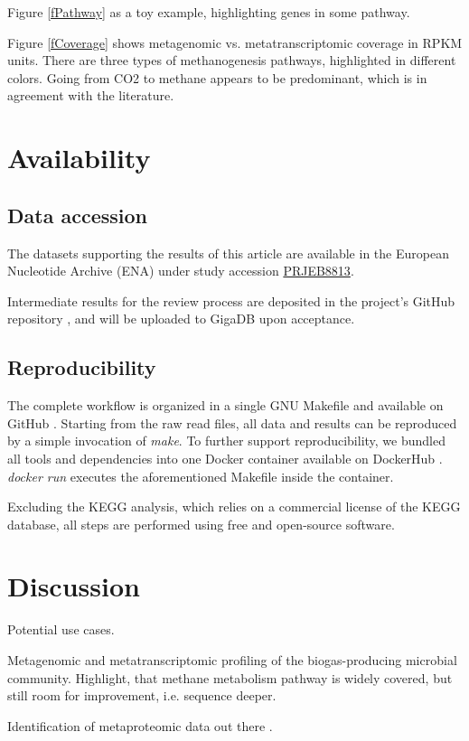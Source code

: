 \documentclass{bmcart}
\begin{document}
Figure \ref{fPathway} as a toy example, highlighting genes in some pathway.

Figure \ref{fCoverage} shows metagenomic vs. metatranscriptomic coverage in RPKM units. There are three types of methanogenesis pathways, highlighted in different colors. Going from CO2 to methane appears to be predominant, which is in agreement with the literature.

\section*{Availability}
\subsection*{Data accession}
The datasets supporting the results of this article are available in the European Nucleotide Archive (ENA) under study accession \href{http://www.ebi.ac.uk/ena/data/view/PRJEB8813}{PRJEB8813}.

Intermediate results for the review process are deposited in the project's GitHub repository \cite{GitHub}, and will be uploaded to GigaDB \cite{GigaDB} upon acceptance.

\subsection*{Reproducibility}
The complete workflow is organized in a single GNU Makefile and available on GitHub \cite{GitHub}.
Starting from the raw read files, all data and results can be reproduced by a simple invocation of \emph{make}.
To further support reproducibility, we bundled all tools and dependencies into one Docker container available on DockerHub \cite{DockerHub}. \emph{docker run} executes the aforementioned Makefile inside the container.

Excluding the KEGG analysis, which relies on a commercial license of the KEGG database, all steps are performed using free and open-source software.

\section*{Discussion}
Potential use cases.

Metagenomic and metatranscriptomic profiling of the biogas-producing microbial community.
Highlight, that methane metabolism pathway is widely covered, but still room for improvement, i.e. sequence deeper.

Identification of metaproteomic data out there \cite{Kohrs2015}.
\end{document}
